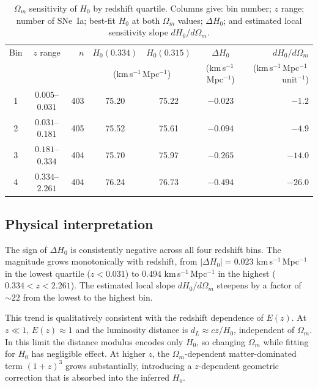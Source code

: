 \documentclass[fleqn,usenatbib,useAMS]{mnras}
\begin{document}
\begin{table}
  \centering
  \caption{$\Omega_m$ sensitivity of $H_0$ by redshift quartile.
    Columns give: bin number; $z$ range; number of SNe~Ia; best-fit
    $H_0$ at both $\Omega_m$ values; $\Delta H_0$; and estimated
    local sensitivity slope $dH_0/d\Omega_m$.}
  \label{tab:zbins}
  \begin{tabular}{ccrcccr}
    \hline
    Bin & $z$ range & $n$
        & $H_0(0.334)$ & $H_0(0.315)$
        & $\Delta H_0$ & $dH_0/d\Omega_m$ \\
        & & & \multicolumn{2}{c}{(km\,s$^{-1}$\,Mpc$^{-1}$)}
              & (km\,s$^{-1}$\,Mpc$^{-1}$)
              & (km\,s$^{-1}$\,Mpc$^{-1}$\,unit$^{-1}$)\\
    \hline
    1 & $0.005$--$0.031$ & 403 & 75.20 & 75.22 & $-0.023$ & $-1.2$ \\
    2 & $0.031$--$0.181$ & 405 & 75.52 & 75.61 & $-0.094$ & $-4.9$ \\
    3 & $0.181$--$0.334$ & 404 & 75.70 & 75.97 & $-0.265$ & $-14.0$ \\
    4 & $0.334$--$2.261$ & 404 & 76.24 & 76.73 & $-0.494$ & $-26.0$ \\
    \hline
  \end{tabular}
\end{table}

\subsection{Physical interpretation}

The sign of $\Delta H_0$ is consistently negative across all four
redshift bins.
The magnitude grows monotonically with redshift,
from $|\Delta H_0| = 0.023$ km\,s$^{-1}$\,Mpc$^{-1}$ in the
lowest quartile ($z < 0.031$) to
$0.494$ km\,s$^{-1}$\,Mpc$^{-1}$ in the highest
($0.334 < z < 2.261$).
The estimated local slope $dH_0/d\Omega_m$ steepens by a factor
of ${\sim}22$ from the lowest to the highest bin.

This trend is qualitatively consistent with the redshift dependence
of $E(z)$.
At $z \ll 1$, $E(z) \approx 1$ and the luminosity distance is
$d_L \approx cz/H_0$, independent of $\Omega_m$.
In this limit the distance modulus encodes only $H_0$, so changing
$\Omega_m$ while fitting for $H_0$ has negligible effect.
At higher $z$, the $\Omega_m$-dependent matter-dominated term
$(1+z)^3$ grows substantially, introducing a $z$-dependent
geometric correction that is absorbed into the inferred $H_0$.
\end{document}
